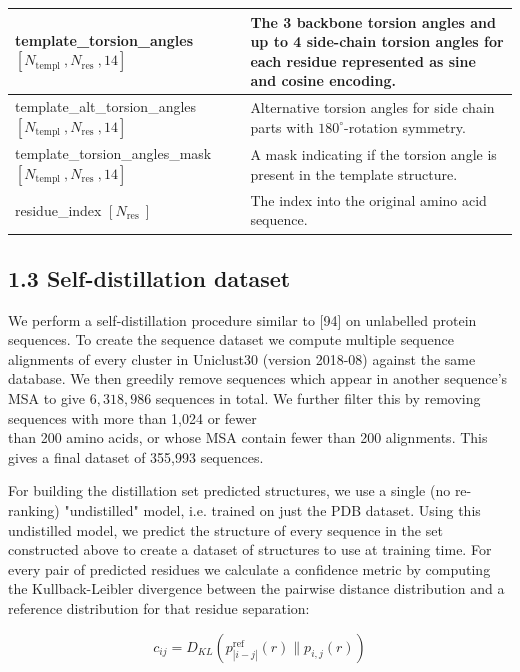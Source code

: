 \documentclass[10pt]{article}
\begin{document}
\begin{center}
\begin{tabular}{|l|l|}
\hline
template\_torsion\_angles $\left[N_{\text {templ }}, N_{\text {res }}, 14\right]$ & The 3 backbone torsion angles and up to 4 side-chain torsion angles for each residue represented as sine and cosine encoding. \\
\hline
template\_alt\_torsion\_angles $\left[N_{\text {templ }}, N_{\text {res }}, 14\right]$ & Alternative torsion angles for side chain parts with $180^{\circ}$-rotation symmetry. \\
\hline
template\_torsion\_angles\_mask $\left[N_{\text {templ }}, N_{\text {res }}, 14\right]$ & A mask indicating if the torsion angle is present in the template structure. \\
\hline
residue\_index $\left[N_{\text {res }}\right]$ & The index into the original amino acid sequence. \\
\hline
\end{tabular}
\end{center}

\subsection*{1.3 Self-distillation dataset}
We perform a self-distillation procedure similar to [94] on unlabelled protein sequences. To create the sequence dataset we compute multiple sequence alignments of every cluster in Uniclust30 (version 2018-08) against the same database. We then greedily remove sequences which appear in another sequence's MSA to give $6,318,986$ sequences in total. We further filter this by removing sequences with more than 1,024 or fewer\\
than 200 amino acids, or whose MSA contain fewer than 200 alignments. This gives a final dataset of 355,993 sequences.

For building the distillation set predicted structures, we use a single (no re-ranking) "undistilled" model, i.e. trained on just the PDB dataset. Using this undistilled model, we predict the structure of every sequence in the set constructed above to create a dataset of structures to use at training time. For every pair of predicted residues we calculate a confidence metric by computing the Kullback-Leibler divergence between the pairwise distance distribution and a reference distribution for that residue separation:


\begin{equation*}
c_{i j}=D_{K L}\left(p_{|i-j|}^{\mathrm{ref}}(r) \| p_{i, j}(r)\right) \tag{1}
\end{equation*}
\end{document}
